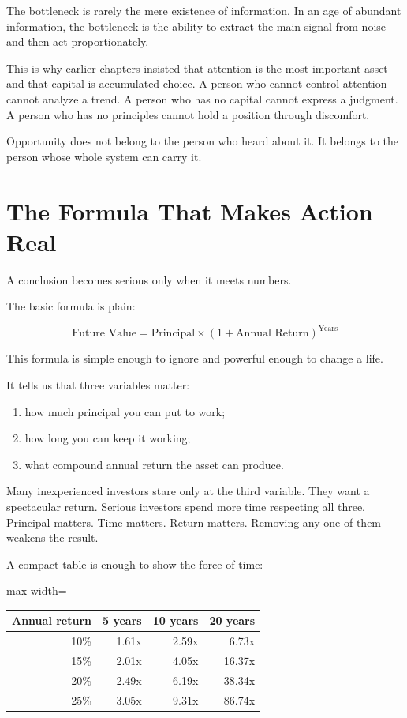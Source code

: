 The bottleneck is rarely the mere existence of information. In an age of abundant information, the bottleneck is the ability to extract the main signal from noise and then act proportionately.

This is why earlier chapters insisted that attention is the most important asset and that capital is accumulated choice. A person who cannot control attention cannot analyze a trend. A person who has no capital cannot express a judgment. A person who has no principles cannot hold a position through discomfort.

Opportunity does not belong to the person who heard about it. It belongs to the person whose whole system can carry it.

\section*{The Formula That Makes Action Real}

A conclusion becomes serious only when it meets numbers.

The basic formula is plain:

\[
\text{Future Value}
=
\text{Principal}
\times
(1+\text{Annual Return})^{\text{Years}}
\]

This formula is simple enough to ignore and powerful enough to change a life.

It tells us that three variables matter:

\begin{enumerate}
\item how much principal you can put to work;
\item how long you can keep it working;
\item what compound annual return the asset can produce.
\end{enumerate}

Many inexperienced investors stare only at the third variable. They want a spectacular return. Serious investors spend more time respecting all three. Principal matters. Time matters. Return matters. Removing any one of them weakens the result.

A compact table is enough to show the force of time:

\begin{center}
\begin{adjustbox}{max width=\linewidth}
\begin{tabular}{rrrr}
\hline
Annual return & 5 years & 10 years & 20 years \\
\hline
10\% & 1.61x & 2.59x & 6.73x \\
15\% & 2.01x & 4.05x & 16.37x \\
20\% & 2.49x & 6.19x & 38.34x \\
25\% & 3.05x & 9.31x & 86.74x \\
\hline
\end{tabular}
\end{adjustbox}
\end{center}

